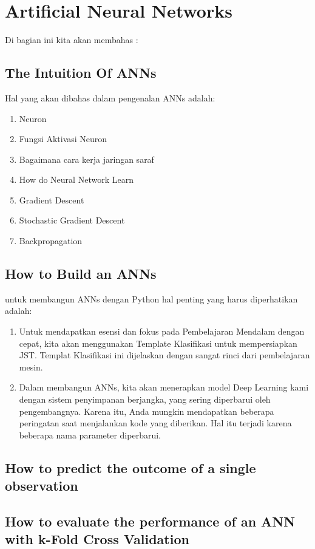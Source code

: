 \section{Artificial Neural Networks}
Di bagian ini kita akan membahas :

\subsection{The Intuition Of ANNs}
Hal yang akan dibahas dalam pengenalan ANNs adalah:
\begin{enumerate}
  \item Neuron
  \item Fungsi Aktivasi Neuron
  \item Bagaimana cara kerja jaringan saraf
  \item How do Neural Network Learn
  \item Gradient Descent
  \item Stochastic Gradient Descent
  \item Backpropagation
\end{enumerate}

\subsection{How to Build an ANNs}
untuk membangun ANNs dengan Python hal penting yang harus diperhatikan adalah:

\begin{enumerate}
  \item  Untuk mendapatkan esensi dan fokus pada Pembelajaran Mendalam dengan cepat, kita akan menggunakan Template Klasifikasi untuk mempersiapkan JST. Templat Klasifikasi ini dijelaskan dengan sangat rinci dari pembelajaran mesin. 
  \item Dalam membangun ANNs, kita akan menerapkan model Deep Learning kami dengan sistem penyimpanan berjangka, yang sering diperbarui oleh pengembangnya. Karena itu, Anda mungkin mendapatkan beberapa peringatan saat menjalankan kode yang diberikan. Hal itu terjadi karena beberapa nama parameter diperbarui.
\end{enumerate}
\subsection{How to predict the outcome of a single observation}
\subsection{How to evaluate the performance of an ANN with k-Fold Cross Validation}
